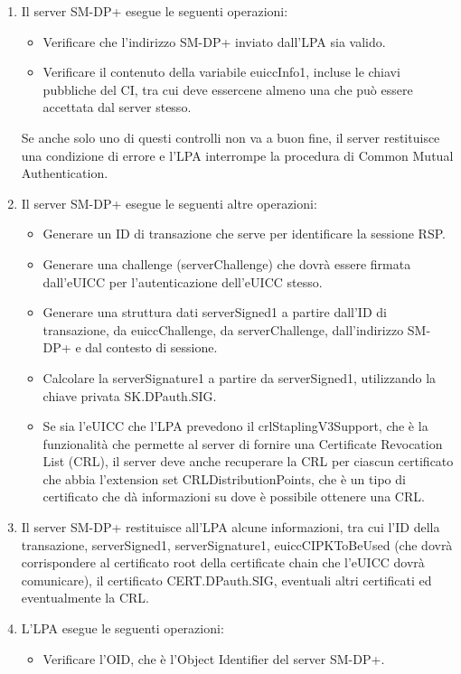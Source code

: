 \documentclass[10pt, twoside, openany]{book}
\begin{document}
\begin{enumerate}
\item Il server SM-DP+ esegue le seguenti operazioni:
\begin{itemize}[itemsep=0pt]
\item Verificare che l'indirizzo SM-DP+ inviato dall'LPA sia valido.
\item Verificare il contenuto della variabile euiccInfo1, incluse le chiavi pubbliche del CI, tra cui deve essercene almeno una che può essere accettata dal server stesso.
\end{itemize}
Se anche solo uno di questi controlli non va a buon fine, il server restituisce una condizione di errore e l'LPA interrompe la procedura di Common Mutual Authentication.
\item Il server SM-DP+ esegue le seguenti altre operazioni:
\begin{itemize}[itemsep=0pt]
\item Generare un ID di transazione che serve per identificare la sessione RSP.
\item Generare una challenge (serverChallenge) che dovrà essere firmata dall'eUICC per l'autenticazione dell'eUICC stesso.
\item Generare una struttura dati serverSigned1 a partire dall'ID di transazione, da euiccChallenge, da serverChallenge, dall'indirizzo SM-DP+ e dal contesto di sessione.
\item Calcolare la serverSignature1 a partire da serverSigned1, utilizzando la chiave privata SK.DPauth.SIG.
\item Se sia l'eUICC che l'LPA prevedono il crlStaplingV3Support, che è la funzionalità che permette al server di fornire una Certificate Revocation List (CRL), il server deve anche recuperare la CRL per ciascun certificato che abbia l'extension set CRLDistributionPoints, che è un tipo di certificato che dà informazioni su dove è possibile ottenere una CRL.
\end{itemize}
\item Il server SM-DP+ restituisce all'LPA alcune informazioni, tra cui l'ID della transazione, serverSigned1, serverSignature1, euiccCIPKToBeUsed (che dovrà corrispondere al certificato root della certificate chain che l'eUICC dovrà comunicare), il certificato CERT.DPauth.SIG, eventuali altri certificati ed eventualmente la CRL.
\item L'LPA esegue le seguenti operazioni:
\begin{itemize}[itemsep=0pt]
\item Verificare l'OID, che è l'Object Identifier del server SM-DP+.

\end{itemize}
\end{enumerate}
\end{document}

